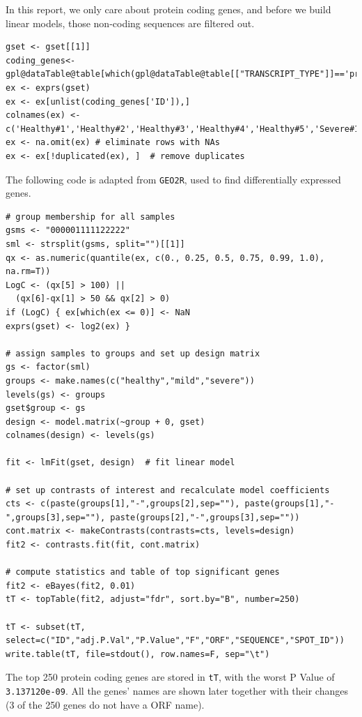 \documentclass[en,black,12pt,normal]{elegantnote}
\begin{document}
In this report, we only care about protein coding genes, and before we build linear models, those non-coding sequences are filtered out.

\begin{lstlisting}
gset <- gset[[1]]
coding_genes<-gpl@dataTable@table[which(gpl@dataTable@table[["TRANSCRIPT_TYPE"]]=='protein_coding'),]
ex <- exprs(gset)
ex <- ex[unlist(coding_genes['ID']),]
colnames(ex) <- c('Healthy#1','Healthy#2','Healthy#3','Healthy#4','Healthy#5','Severe#1','Severe#2','Severe#3','Severe#4','Severe#5','Mild#1','Mild#2','Mild#3','Mild#4','Mild#5')
ex <- na.omit(ex) # eliminate rows with NAs
ex <- ex[!duplicated(ex), ]  # remove duplicates
\end{lstlisting}

The following code is adapted from \lstinline{GEO2R}, used to find differentially expressed genes.
\begin{lstlisting}
# group membership for all samples
gsms <- "000001111122222"
sml <- strsplit(gsms, split="")[[1]]
qx <- as.numeric(quantile(ex, c(0., 0.25, 0.5, 0.75, 0.99, 1.0), na.rm=T))
LogC <- (qx[5] > 100) ||
  (qx[6]-qx[1] > 50 && qx[2] > 0)
if (LogC) { ex[which(ex <= 0)] <- NaN
exprs(gset) <- log2(ex) }

# assign samples to groups and set up design matrix
gs <- factor(sml)
groups <- make.names(c("healthy","mild","severe"))
levels(gs) <- groups
gset$group <- gs
design <- model.matrix(~group + 0, gset)
colnames(design) <- levels(gs)

fit <- lmFit(gset, design)  # fit linear model

# set up contrasts of interest and recalculate model coefficients
cts <- c(paste(groups[1],"-",groups[2],sep=""), paste(groups[1],"-",groups[3],sep=""), paste(groups[2],"-",groups[3],sep=""))
cont.matrix <- makeContrasts(contrasts=cts, levels=design)
fit2 <- contrasts.fit(fit, cont.matrix)

# compute statistics and table of top significant genes
fit2 <- eBayes(fit2, 0.01)
tT <- topTable(fit2, adjust="fdr", sort.by="B", number=250)

tT <- subset(tT, select=c("ID","adj.P.Val","P.Value","F","ORF","SEQUENCE","SPOT_ID"))
write.table(tT, file=stdout(), row.names=F, sep="\t")
\end{lstlisting}

The top 250 protein coding genes are stored in \lstinline{tT}, with the worst P Value of \lstinline{3.137120e-09}. All the genes' names are shown later together with their changes (3 of the 250 genes do not have a ORF name).
\end{document}
